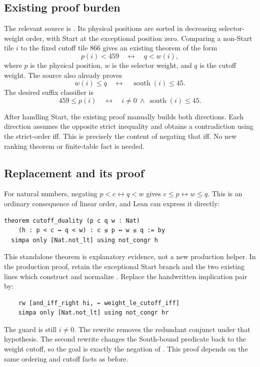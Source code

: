 \documentclass[11pt]{article}
\newcommand{\name}[1]{\texttt{\detokenize{#1}}}
\newcommand{\repo}[2]{\href{https://github.com/VladimirReshetnikov/ProveIt/blob/89226e3921bce3e8949fadd12d3efb6914c7630c/Computability/DiophantineConsistency/Lean/DiophantineConsistency/#1.lean}{#2}}
\begin{document}
\subsection{Existing proof burden}

The relevant source is
\repo{CurrentSelectorTail2011}{\name{CurrentSelectorTail2011.lean}}.
Its physical positions are sorted in decreasing selector-weight order, with
Start at the exceptional position zero. Comparing a non-Start tile \(i\) to
the fixed cutoff tile 866 gives an existing theorem of the form
\[
  p(i)<459\quad\longleftrightarrow\quad q<w(i),
\]
where \(p\) is the physical position, \(w\) is the selector weight, and \(q\)
is the cutoff weight. The source also already proves
\[
  w(i)\le q\quad\longleftrightarrow\quad \operatorname{south}(i)\le45.
\]
The desired suffix classifier is
\[
 459\le p(i)\quad\longleftrightarrow\quad
 i\ne0\ \land\ \operatorname{south}(i)\le45.
\]

After handling Start, the existing proof manually builds both directions.
Each direction assumes the opposite strict inequality and obtains a
contradiction using the strict-order iff. This is precisely the content of
negating that iff. No new ranking theorem or finite-table fact is needed.

\subsection{Replacement and its proof}

For natural numbers, negating \(p<c\leftrightarrow q<w\) gives
\(c\le p\leftrightarrow w\le q\). This is an ordinary consequence of linear
order, and Lean can express it directly:

\begin{lstlisting}
theorem cutoff_duality (p c q w : Nat)
    (h : p < c ↔ q < w) : c ≤ p ↔ w ≤ q := by
  simpa only [Nat.not_lt] using not_congr h
\end{lstlisting}

This standalone theorem is explanatory evidence, not a new production helper.
In the production proof, retain the exceptional Start branch and the two
existing lines which construct and normalize \name{hr}. Replace the
handwritten implication pair by:

\begin{lstlisting}
    rw [and_iff_right hi, ← weight_le_cutoff_iff]
    simpa only [Nat.not_lt] using not_congr hr
\end{lstlisting}

The guard \name{hi} is still \(i\ne0\). The rewrite removes the redundant
conjunct under that hypothesis. The second rewrite changes the South-bound
predicate back to the weight cutoff, so the goal is exactly the negation of
\name{hr}. This proof depends on the same ordering and cutoff facts as before.
\end{document}
